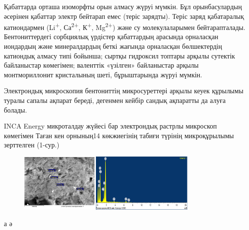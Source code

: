 Қабаттарда орташа изоморфты орын алмасу жүруі мүмкін. Бұл орынбасулардың
әсерінен қабаттар электр бейтарап емес (теріс зарядты). Теріс заряд
қабатаралық катиондармен (Li\textsuperscript{+}, Са\textsuperscript{2+},
К\textsuperscript{+}, Mg\textsuperscript{2+}) және су молекулаларымен
бейтарапталады. Бентониттердегі сорбциялық үрдістер қабаттардың арасында
орналасқан иондардың және минералдардың беткі жағында орналасқан
бөлшектердің катиондық алмасу типі бойынша; сыртқы гидроксил топтары
арқылы сутектік байланыстар көмегімен; валенттік «үзілген» байланыстар
арқылы монтмориллонит кристалының шеті, бұрыштарында жүруі мүмкін.

Электрондық микроскопия бентониттің микросуреттері арқылы кеуек құрылымы
туралы сапалы ақпарат береді, дегенмен кейбір сандық ақпаратты да алуға
болады.

INCA Energy микроталдау жүйесі бар электрондық растрлы микроскоп
көмегімен Таған кен орнының14 көкжиегінің табиғи түрінің микроқұрылымы
зерттелген (1-сур.)

\begin{figure}[H]
	\centering
	\includegraphics[width=0.8\textwidth]{assets/1043}
	\caption*{}
\end{figure}

а ә

